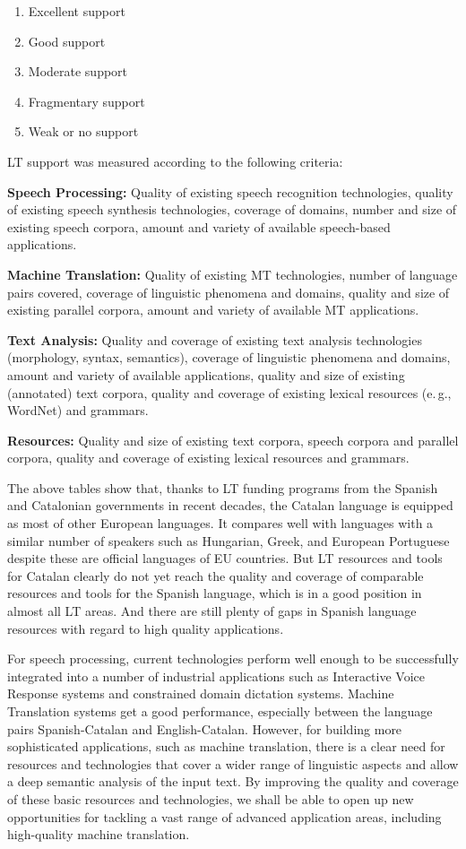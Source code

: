 \documentclass[]{../../metanetpaper}
\begin{document}
\begin{multicols}{2}
\begin{enumerate}
\item Excellent support
\item Good support
\item Moderate support
\item Fragmentary support
\item Weak or no support
\end{enumerate}

LT support was measured according to the following criteria:

\textbf{Speech Processing:} Quality of existing speech recognition technologies, quality of existing speech synthesis technologies, coverage of domains, number and size of existing speech corpora, amount and variety of available speech-based applications.

\textbf{Machine Translation:} Quality of existing MT technologies, number of language pairs covered, coverage of linguistic phenomena and domains, quality and size of existing parallel corpora, amount and variety of available MT applications.

\textbf{Text Analysis:} Quality and coverage of existing text analysis technologies (morphology, syntax, semantics), coverage of linguistic phenomena and domains, amount and variety of available applications, quality and size of existing (annotated) text corpora, quality and coverage of existing lexical resources (e.\,g., WordNet) and grammars.

\textbf{Resources:} Quality and size of existing text corpora, speech corpora and parallel corpora, quality and coverage of existing lexical resources and grammars.

The above tables show that, thanks to LT funding programs from the Spanish and Catalonian governments in recent decades, the Catalan language is equipped as most of other European languages. It compares well with languages with a similar number of speakers such as Hungarian, Greek, and European Portuguese despite these are official languages of EU countries. But LT resources and tools for Catalan clearly do not yet reach the quality and coverage of comparable resources and tools for the Spanish language, which is in a good position in almost all LT areas. And there are still plenty of gaps in Spanish language resources with regard to high quality applications.

For speech processing, current technologies perform well enough to be successfully integrated into a number of industrial applications such as Interactive Voice Response systems and constrained domain dictation systems. Machine Translation systems get a good performance, especially between the language pairs Spanish-Catalan and English-Catalan. However, for building more sophisticated applications, such as machine translation, there is a clear need for resources and technologies that cover a wider range of linguistic aspects and allow a deep semantic analysis of the input text. By improving the quality and coverage of these basic resources and technologies, we shall be able to open up new opportunities for tackling a vast range of advanced application areas, including high-quality machine translation.  


\end{multicols}
\end{document}
